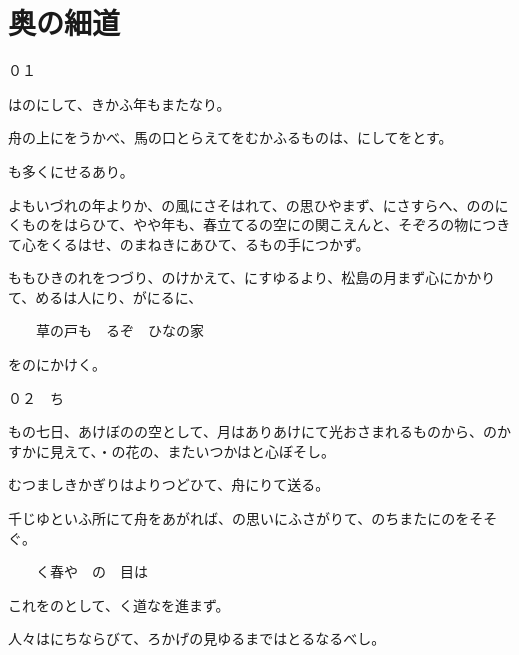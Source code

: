 \section{奥の細道}
０１　

はのにして、きかふ年もまたなり。

舟の上にをうかべ、馬の口とらえてをむかふるものは、にしてをとす。

も多くにせるあり。

よもいづれの年よりか、の風にさそはれて、の思ひやまず、にさすらへ、ののにくものをはらひて、やや年も、春立てるの空にの関こえんと、そぞろの物につきて心をくるはせ、のまねきにあひて、るもの手につかず。

ももひきのれをつづり、のけかえて、にすゆるより、松島の月まず心にかかりて、めるは人にり、がにるに、

　　草の戸も　るぞ　ひなの家

をのにかけく。

０２　ち

もの七日、あけぼのの空として、月はありあけにて光おさまれるものから、のかすかに見えて、・の花の、またいつかはと心ぼそし。

むつましきかぎりはよりつどひて、舟にりて送る。

千じゆといふ所にて舟をあがれば、の思いにふさがりて、のちまたにのをそそぐ。

　　く春や　の　目は

これをのとして、く道なを進まず。

人々はにちならびて、ろかげの見ゆるまではとるなるべし。